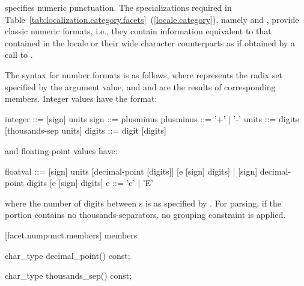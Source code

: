 \pnum
{}
specifies numeric punctuation.
The specializations required in Table~\ref{tab:localization.category.facets}~(\ref{locale.category}), namely
and
,
provide classic
numeric formats,
i.e., they contain information equivalent to that contained in the
locale or their wide character counterparts as if obtained by
a call to
.

\pnum
The syntax for number formats is as follows, where
represents the radix set specified by the
argument value, and
and
are the results of corresponding
members.
Integer values have the format:

\begin{codeblock}
integer   ::= [sign] units
sign      ::= plusminus
plusminus ::= '+' | '-'
units     ::= digits [thousands-sep units]
digits    ::= digit [digits]
\end{codeblock}

and floating-point values have:

\begin{codeblock}
floatval ::= [sign] units [decimal-point [digits]] [e [sign] digits] |
             [sign]        decimal-point  digits   [e [sign] digits]
e        ::= 'e' | 'E'
\end{codeblock}

where the number of digits between
s
is as specified by
.
For parsing, if the
portion contains no thousands-separators, no grouping constraint
is applied.

[facet.numpunct.members]{ members}

%
%
\begin{itemdecl}
char_type decimal_point() const;
\end{itemdecl}

\begin{itemdescr}
\pnum
\returns
{}
\end{itemdescr}

%
%
\begin{itemdecl}
char_type thousands_sep() const;
\end{itemdecl}

